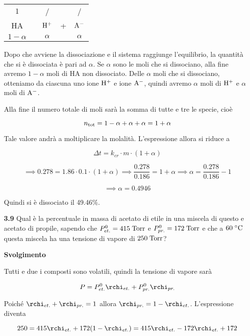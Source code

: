 \begin{center}
    \begin{tabular}{ccccc}
        $1$ & & / & & /\\
        HA & \ce{<-->} & $\rm H^+$ & + & $\rm A^-$\\
        $1 - \alpha$ &  &  $\alpha$ & & $\alpha$\\
    \end{tabular}
\end{center}

Dopo che avviene la dissociazione e il sistema raggiunge l'equilibrio, la quantità che si è dissociata è pari ad $\alpha$. Se $\alpha$ sono le moli che si dissociano, alla fine avremo $1-\alpha$ moli di HA non dissociato. Delle $\alpha$ moli che si dissociano, otteniamo da ciascuna uno ione $\rm H^+$ e ione $\rm A^-$, quindi avremo $\alpha$ moli di $\rm H^+$ e $\alpha$ moli di $\rm A^-$.

Alla fine il numero totale di moli sarà la somma di tutte e tre le specie, cioè

$$n_{\rm tot}=1 - \alpha + \alpha + \alpha=1+\alpha$$

Tale valore andrà a moltiplicare la molalità. L'espressione allora si riduce a

$$\Delta t=k_{cr} \cdot m \cdot (1 + \alpha)$$

$$\implies
0.278 = 1.86 \cdot 0.1 \cdot (1+\alpha)
\implies
\frac{0.278}{0.186}= 1 + \alpha
\implies
\alpha=\frac{0.278}{0.186} - 1$$

$$\implies \alpha=0.4946$$

Quindi si è dissociato il 49.46\%.

\vspace{0.2cm}\textbf{3.9} Qual è la percentuale in massa di acetato di etile in una miscela di questo e acetato di propile, sapendo che $P_{et.}^0=415 \; \rm Torr$ e $P_{pr.}^0=172 \; \rm Torr$ e che a $60 \; ^{\circ} \rm C$ questa miscela ha una tensione di vapore di $250 \; \rm Torr$?

\vspace{0.2cm}\large\textbf{Svolgimento}\normalsize

\vspace{0.2cm}Tutti e due i composti sono volatili, quindi la tensione di vapore sarà

$$P=P_{et.}^0\rchi_{et.} + P_{pr.}^0\rchi_{pr.}$$

Poiché $\rchi_{et.} + \rchi_{pr.}=1$ allora $\rchi_{pr.}=1 - \rchi_{et.}$. L'espressione diventa

$$250=415 \rchi_{et.} + 172(1 - \rchi_{et.})
=415 \rchi_{et.} - 172 \rchi_{et.} + 172$$

